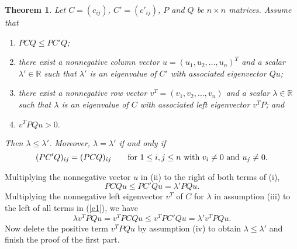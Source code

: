 \documentclass{beamer}
\theoremstyle{plain}
\newtheorem{thm}{Theorem}[section]
\theoremstyle{definition}
\begin{document}
\begin{frame}
    


    \begin{thm}\label{pre_thm}
        Let $C=(c_{ij})$, $C'=(c'_{ij})$, $P$ and $Q$ be  $n\times n$ matrices.
        Assume that
        \begin{enumerate}
            \item[(i)]    $PCQ\leq PC'Q$;\label{Q1}
            \item[(ii)]  there exist a nonnegative column vector $u=(u_1, u_2, \ldots, u_n)^T$  and a scalar $\lambda'\in \mathbb{R}$ such that $\lambda'$ is an eigenvalue of $C'$ with associated eigenvector $Qu$;
            \item[(iii)] there exist a nonnegative row vector $v^T=(v_1, v_2, \ldots, v_n)$  and a scalar $\lambda\in \mathbb{R}$
            such that $\lambda$ is an eigenvalue of $C$ with associated  left eigenvector $v^TP$; and
            \item[(iv)] $v^TPQu>0.$
            \end{enumerate}
            Then $\lambda\leq \lambda'$.
                Moreover, $\lambda=\lambda'$ 
            if and only if
                \begin{equation}
                    \label{e3}
            (PC'Q)_{ij}=(PCQ)_{ij}\qquad \hbox{for~}1\leq i, j\leq n \hbox{~with~} v_i\ne 0 \hbox{~and~} u_j\ne 0.
        \end{equation}
    \end{thm}%
\end{frame}

\begin{frame}
            Multiplying the nonnegative vector $u$ in (ii) to the right of both terms of  (i),
        \begin{equation}\label{e1}
            PCQu\leq PC'Qu=\lambda'PQu.
        \end{equation}
        Multiplying the nonnegative left eigenvector $v^T$ of $C$ for $\lambda$ in assumption (iii) to the left of all terms  in (\ref{e1}), we have
        \begin{equation}\label{e2}
            \lambda v^TPQu=v^TPCQu\leq v^TPC'Qu=\lambda' v^TPQu.
        \end{equation}
        Now delete the positive term $v^TPQu$ by assumption (iv) to obtain $\lambda\leq \lambda'$ and finish the proof of the first part.
\end{frame}
\end{document}
